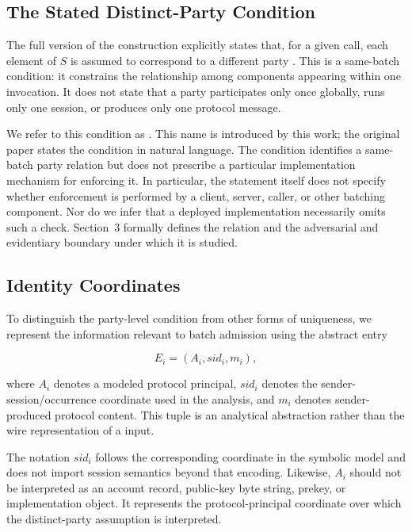\subsection{The Stated Distinct-Party Condition}

The full version of the \kwaay construction explicitly states that, for a
given \batchreceive call, each element of $S$ is assumed to correspond to a
different party \cite[Sec.~5.1, p.~21, after Fig.~10]{collins2024kwaayfull}. This is a
same-batch condition: it constrains the relationship among components
appearing within one \batchreceive invocation. It does not state that a party
participates only once globally, runs only one session, or produces only one
protocol message.

We refer to this condition as \distinctparty. This name is introduced by this
work; the original \kwaay paper states the condition in natural language. The
condition identifies a same-batch party relation but does not prescribe a
particular implementation mechanism for enforcing it. In particular, the
statement itself does not specify whether enforcement is performed by a
client, server, caller, or other batching component. Nor do we infer that a
deployed implementation necessarily omits such a check. Section~3 formally
defines the relation and the adversarial and evidentiary boundary under which
it is studied.

\subsection{Identity Coordinates}

To distinguish the party-level condition from other forms of uniqueness, we
represent the information relevant to batch admission using the abstract entry

\begin{equation}
  E_i=(A_i,\mathit{sid}_i,m_i),
  \label{eq:abstract-entry}
\end{equation}

where $A_i$ denotes a modeled protocol principal, $\mathit{sid}_i$ denotes the
sender-session/occurrence coordinate used in the analysis, and $m_i$ denotes
sender-produced protocol content. This tuple is an analytical abstraction
rather than the wire representation of a \kwaay input.

The notation $\mathit{sid}_i$ follows the corresponding coordinate in the
symbolic model and does not import session semantics beyond that encoding.
Likewise, $A_i$ should not be interpreted as an account record, public-key byte
string, prekey, or implementation object. It represents the protocol-principal
coordinate over which the distinct-party assumption is interpreted.

